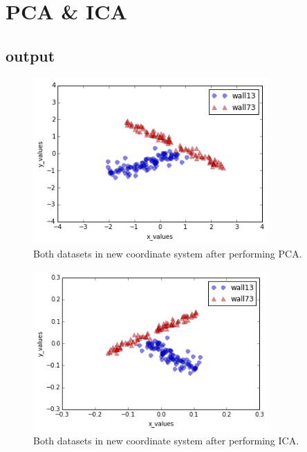 \documentclass[paper=a4, fontsize=11pt]{scrartcl} %
\numberwithin{equation}{section} %
\numberwithin{figure}{section} %
\numberwithin{table}{section} %
\begin{document}
\section{PCA \& ICA}

\subsection{output}
\begin{figure}[ht]
	\centering
  \includegraphics[width=0.8\textwidth]{combined.png}
	\caption{Both datasets in new coordinate system after performing PCA.}
	\label{fig1}
\end{figure}

\begin{figure}[ht]
	\centering
  \includegraphics[width=0.8\textwidth]{combined_ica.png}
	\caption{Both datasets in new coordinate system after performing ICA.}
	\label{fig1}
\end{figure}
\end{document}
